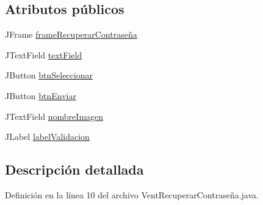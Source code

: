 \subsection*{Atributos públicos}
\begin{DoxyCompactItemize}
\item 
J\-Frame \hyperlink{classcom_1_1ucab_1_1javachat_1_1_cliente_1_1view_1_1_vent_recuperar_contrase_xC3_xB1a_a04128faac0a1606d3b7377debaf91fc9}{frame\-Recuperar\-Contraseña}
\item 
J\-Text\-Field \hyperlink{classcom_1_1ucab_1_1javachat_1_1_cliente_1_1view_1_1_vent_recuperar_contrase_xC3_xB1a_a46bf84eb2459fc2de03962e04fbc053f}{text\-Field}
\item 
J\-Button \hyperlink{classcom_1_1ucab_1_1javachat_1_1_cliente_1_1view_1_1_vent_recuperar_contrase_xC3_xB1a_a018ea4776e5b9ff7076aa560b4f19fe9}{btn\-Seleccionar}
\item 
J\-Button \hyperlink{classcom_1_1ucab_1_1javachat_1_1_cliente_1_1view_1_1_vent_recuperar_contrase_xC3_xB1a_a706b0887be2a8a4995cf3f6b3b81f16b}{btn\-Enviar}
\item 
J\-Text\-Field \hyperlink{classcom_1_1ucab_1_1javachat_1_1_cliente_1_1view_1_1_vent_recuperar_contrase_xC3_xB1a_adc729281b50ba2ae30e501f66bdf0a78}{nombre\-Imagen}
\item 
J\-Label \hyperlink{classcom_1_1ucab_1_1javachat_1_1_cliente_1_1view_1_1_vent_recuperar_contrase_xC3_xB1a_ae45dbcec0eea72f20ec90412c86167f1}{label\-Validacion}
\end{DoxyCompactItemize}


\subsection{Descripción detallada}


Definición en la línea 10 del archivo Vent\-Recuperar\-Contraseña.\-java.



